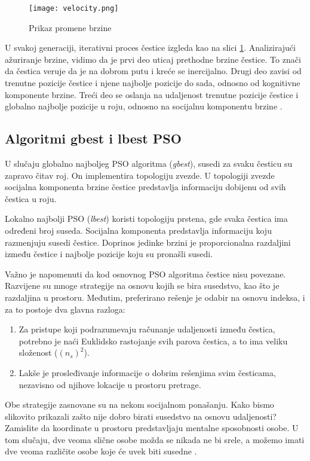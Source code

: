 \documentclass[a4paper]{article}
\begin{document}
\begin{figure}[htp]
    \centering
    \texttt{[image: velocity.png]}
    \caption{Prikaz promene brzine}
    \label{fig:velocity}
\end{figure}

U svakoj generaciji, iterativni proces čestice izgleda kao na slici \ref{fig:velocity}. Analizirajući ažuriranje brzine, vidimo da je prvi deo uticaj prethodne brzine čestice. To znači da čestica veruje da je na dobrom putu i kreće se inercijalno. Drugi deo zavisi od trenutne pozicije čestice i njene najbolje pozicije do sada, odnosno od kognitivne komponente brzine. Treći deo se oslanja na udaljenost trenutne pozicije čestice i globalno najbolje pozicije u roju, odnosno na socijalnu komponentu brzine \cite{wang2018particle}. 

\subsection{Algoritmi gbest i lbest PSO}
\label{subsec:podnaslov1}

U slučaju globalno najboljeg PSO algoritma (\textit{gbest}), susedi za svaku česticu su zapravo čitav roj. On implementira topologiju zvezde. U topologiji zvezde socijalna komponenta brzine čestice predstavlja informaciju dobijenu od svih čestica u roju. 

Lokalno najbolji PSO (\textit{lbest}) koristi topologiju prstena, gde svaka čestica ima određeni broj suseda. Socijalna komponenta predstavlja informaciju koju razmenjuju susedi čestice. Doprinos jedinke brzini je proporcionalna razdaljini između čestice i najbolje pozicije koju su pronašli susedi. 

Važno je napomenuti da kod osnovnog PSO algoritma čestice nisu povezane. Razvijene su mnoge strategije na osnovu kojih se bira susedstvo, kao što je razdaljina u prostoru. Međutim, preferirano rešenje je odabir na osnovu indeksa, i za to postoje dva glavna razloga:
\begin{enumerate}
    \item Za pristupe koji podrazumevaju računanje udaljenosti između čestica, potrebno je naći Euklidsko rastojanje svih parova čestica, a to ima veliku složenost ($(n_s)^2$).
    \item Lakše je prosleđivanje informacije o dobrim rešenjima svim česticama, nezavisno od njihove lokacije u prostoru pretrage.

\end{enumerate}
Obe strategije zasnovane su na nekom socijalnom ponašanju. Kako bismo slikovito prikazali zašto nije dobro birati susedstvo na osnovu udaljenosti? Zamislite da koordinate u prostoru predstavljaju mentalne sposobnosti osobe. U tom slučaju, dve veoma slične osobe možda se nikada ne bi srele, a možemo imati dve veoma različite osobe koje će uvek biti susedne \cite{liu2006particle}.
    
\end{document}

